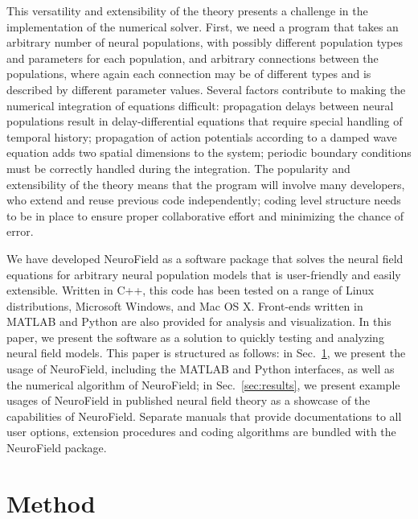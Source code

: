 \documentclass[preprint,review,10pt,authoryear,letterpaper]{elsarticle}
\begin{document}
This versatility and extensibility of the theory presents a challenge in the implementation of the numerical solver. First, we need a program that takes an arbitrary number of neural populations, with possibly different population types and parameters for each population, and arbitrary connections between the populations, where again each connection may be of different types and is described by different parameter values. Several factors contribute to making the numerical integration of equations difficult: propagation delays between neural populations result in delay-differential equations that require special handling of temporal history; propagation of action potentials according to a damped wave equation adds two spatial dimensions to the system; periodic boundary conditions must be correctly handled during the integration. The popularity and extensibility of the theory means that the program will involve many developers, who extend and reuse previous code independently; coding level structure needs to be in place to ensure proper collaborative effort and minimizing the chance of error.

We have developed NeuroField as a software package that solves the neural field equations for arbitrary neural population models that is user-friendly and easily extensible. Written in C++, this code has been tested on a range of Linux distributions, Microsoft Windows, and Mac OS X. Front-ends written in MATLAB and Python are also provided for analysis and visualization. In this paper, we present the software as a solution to quickly testing and analyzing neural field models. This paper is structured as follows: in Sec.~\ref{sec:method}, we present the usage of NeuroField, including the MATLAB and Python interfaces, as well as the numerical algorithm of NeuroField; in Sec.~\ref{sec:results}, we present example usages of NeuroField in published neural field theory as a showcase of the capabilities of NeuroField. Separate manuals that provide documentations to all user options, extension procedures and coding algorithms are bundled with the NeuroField package.

\section{Method}
\label{sec:method}
\end{document}

